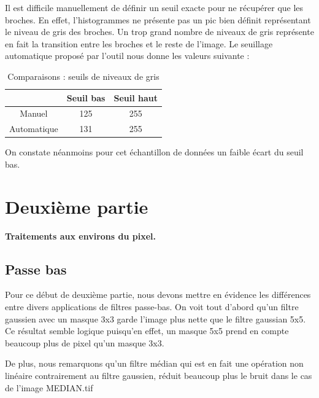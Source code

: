 \documentclass{scrreprt}
\begin{document}
\newpage
Il est difficile manuellement de définir un seuil exacte pour ne récupérer que les broches.
En effet, l'histogrammes ne présente pas un pic bien définit représentant le niveau de gris 
des broches. Un trop grand nombre de niveaux de gris représente en fait la transition entre
les broches et le reste de l'image. Le seuillage automatique proposé par l'outil nous donne 
les valeurs suivante : 

\begin{table}[H]
        \begin{center}
                \begin{tabular}{|c|c|c|}
                   \hline
                   & Seuil bas & Seuil haut \\
                   \hline
                   Manuel & 125 & 255\\
                   \hline
                   Automatique & 131 & 255\\
                   \hline
                \end{tabular}
        \end{center}
        \caption{Comparaisons : seuils de niveaux de gris}
\end{table} 

On constate néanmoins pour cet échantillon de données un faible écart du seuil bas.

\chapter{Deuxième partie}

\begin{center}
\large{
\textbf{Traitements aux environs du pixel.}}
\end{center}

\section{Passe bas}

Pour ce début de deuxième partie, nous devons mettre en évidence les différences entre divers applications de filtres passe-bas.
On voit tout d'abord qu'un filtre gaussien avec un masque 3x3 garde l'image plus nette que le filtre gaussian 5x5. Ce résultat semble logique
puisqu'en effet, un masque 5x5 prend en compte beaucoup plus de pixel qu'un masque 3x3.

De plus, nous remarquons qu'un filtre médian qui est en fait une opération non linéaire contrairement au filtre gaussien, réduit beaucoup plus le bruit
dans le cas de l'image MEDIAN.tif
\end{document}
